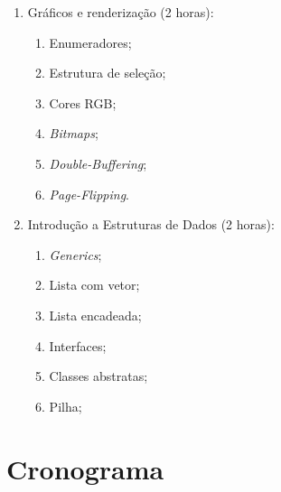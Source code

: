 \documentclass{article}
\begin{document}
\begin{enumerate}
    \item Gráficos e renderização (2 horas):
        \begin{enumerate}
            \item Enumeradores;
            \item Estrutura de seleção;
            \item Cores RGB\@;
            \item \textit{Bitmaps};
            \item \textit{Double-Buffering};
            \item \textit{Page-Flipping}.
        \end{enumerate}
    \item Introdução a Estruturas de Dados (2 horas):
        \begin{enumerate}
            \item \textit{Generics};
            \item Lista com vetor;
            \item Lista encadeada;
            \item Interfaces;
            \item Classes abstratas;
            \item Pilha;
        \end{enumerate}
\end{enumerate}

\section{Cronograma}
\end{document}
